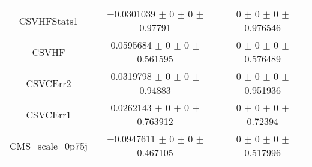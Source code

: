 \begin{table}
\begin{tabular}{ccc}
CSVHFStats1 & \num{-0.0301039} $\pm$ \num{0} $\pm$ \num{0} $\pm$ \num{0.97791} & \num{0} $\pm$ \num{0} $\pm$ \num{0} $\pm$ \num{0.976546}\\
CSVHF & \num{0.0595684} $\pm$ \num{0} $\pm$ \num{0} $\pm$ \num{0.561595} & \num{0} $\pm$ \num{0} $\pm$ \num{0} $\pm$ \num{0.576489}\\
CSVCErr2 & \num{0.0319798} $\pm$ \num{0} $\pm$ \num{0} $\pm$ \num{0.94883} & \num{0} $\pm$ \num{0} $\pm$ \num{0} $\pm$ \num{0.951936}\\
CSVCErr1 & \num{0.0262143} $\pm$ \num{0} $\pm$ \num{0} $\pm$ \num{0.763912} & \num{0} $\pm$ \num{0} $\pm$ \num{0} $\pm$ \num{0.72394}\\
CMS\_scale\_0p75j & \num{-0.0947611} $\pm$ \num{0} $\pm$ \num{0} $\pm$ \num{0.467105} & \num{0} $\pm$ \num{0} $\pm$ \num{0} $\pm$ \num{0.517996}\\
\bottomrule
\end{tabular}
\end{table}